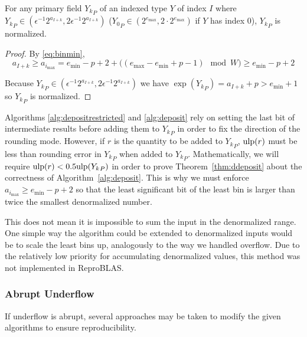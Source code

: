       \begin{samepage}
      \begin{thm}
        For any primary field ${Y_k}_P$ of an indexed type $Y$ of index $I$ where ${Y_k}_P \in (\epsilon^{-1} 2^{a_{I + k}}, 2 \epsilon^{-1} 2^{a_{I + k}})$ (${Y_0}_P \in (2^{e_{\max}}, 2 \cdot 2^{e_{\max}})$ if $Y$ has index 0), ${Y_k}_P$ is normalized.
        \label{thm:underflowufp}
      \end{thm}
      \end{samepage}

      \begin{proof}
        By \eqref{eq:binmin},
        \[
        a_{I + k} \geq a_{i_{\max}} = e_{\min} - p + 2 + \bigl((e_{\max} - e_{\min} + p - 1) \mod W\bigr) \geq e_{\min} - p + 2
        \]

        Because ${Y_k}_P \in (\epsilon^{-1} 2^{a_{I + k}}, 2 \epsilon^{-1} 2^{a_{I + k}})$ we have $\exp({Y_k}_P) = a_{I + k} + p > e_{\min} + 1$ so ${Y_k}_P$ is normalized.
      \end{proof}

      Algorithms \ref{alg:depositrestricted} and \ref{alg:deposit} rely on
      setting the last bit of intermediate results before adding them to
      ${Y_k}_P$ in order to fix the direction of the rounding mode. However, if
      $r$ is the quantity to be added to ${Y_k}_P$, $\text{ulp}(r)$ must be less than
      rounding error in ${Y_k}_P$ when added to ${Y_k}_P$.
      Mathematically, we will require $\text{ulp}(r) < 0.5\text{ulp}({Y_k}_P)$ in order to
      prove Theorem~\ref{thm:ddeposit} about the correctness of
      Algorithm~\ref{alg:deposit}.  This is why we must enforce $a_{i_{\max}}
      \geq e_{\min} - p + 2$ so that the least significant bit of the least bin
      is larger than twice the smallest denormalized number.

      This does not mean it is impossible to sum the input in the denormalized range. One simple way
      the algorithm could be extended to denormalized inputs would be to scale
      the least bins up, analogously to the way we handled overflow. Due to the
      relatively low priority for accumulating denormalized values, this method
      was not implemented in ReproBLAS.

    \subsubsection{Abrupt Underflow}
      \label{sec:indexed_underflow_abrupt}
      If underflow is abrupt, several approaches may be taken to modify the
      given algorithms to ensure reproducibility.

